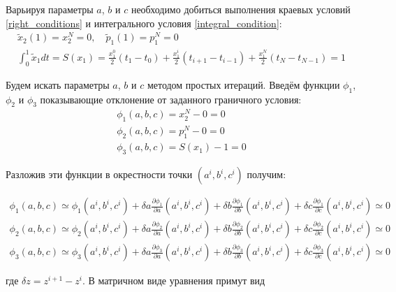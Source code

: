 \documentclass[a4paper,12pt]{article}
\begin{document}
Варьируя параметры \(a\), \(b\) и \(c\) необходимо добиться выполнения краевых условий \cref{right_conditions} и интегрального условия \cref{integral_condition}:
\begin{gather*}
  \tilde{x}_2(1)=x_2^N=0, \quad \tilde{p}_1(1)=p_1^N=0\\
  \int_0^1\tilde{x}_1dt=S(x_1)=\frac{x_1^0}{2} (t_1-t_0) + \frac{x_1^i}{2}(t_{i+1}-t_{i-1}) + \frac{x_1^N}{2} (t_N-t_{N-1})=1
\end{gather*}

Будем искать параметры \(a\), \(b\) и \(c\) методом простых итераций. Введём
функции \(\phi_1\), \(\phi_2\) и \(\phi_3\) показывающие отклонение от заданного
граничного условия:
\begin{gather*}
  \phi_1(a,b,c)=x_2^N-0=0\\
  \phi_2(a,b,c)=p_1^N-0=0\\
  \phi_3(a,b,c)=S(x_1)-1=0
\end{gather*}

Разложив эти функции в окрестности точки \((a^i, b^i, c^i)\) получим:

\begin{gather*}
  \phi_1(a,b,c)\simeq\phi_1(a^i,b^i,c^i)+\delta a\frac{\partial \phi_1}{\partial a}(a^i,b^i,c^i)+\delta b\frac{\partial \phi_1}{\partial b}(a^i,b^i,c^i)+\delta c\frac{\partial \phi_1}{\partial c}(a^i,b^i,c^i)\simeq0\\
  \phi_2(a,b,c)\simeq\phi_2(a^i,b^i,c^i)+\delta a\frac{\partial \phi_2}{\partial a}(a^i,b^i,c^i)+\delta b\frac{\partial \phi_2}{\partial b}(a^i,b^i,c^i)+\delta c\frac{\partial \phi_2}{\partial c}(a^i,b^i,c^i)\simeq0\\
  \phi_3(a,b,c)\simeq\phi_3(a^i,b^i,c^i)+\delta a\frac{\partial \phi_3}{\partial a}(a^i,b^i,c^i)+\delta b\frac{\partial \phi_3}{\partial b}(a^i,b^i,c^i)+\delta c\frac{\partial \phi_3}{\partial c}(a^i,b^i,c^i)\simeq0
\end{gather*}

где \(\delta z=z^{i+1}-z^{i}\). В матричном виде уравнения примут вид
\end{document}
